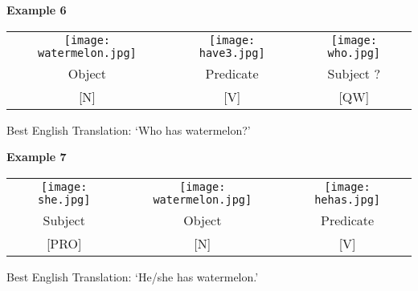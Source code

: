 \documentclass{tufte-book}
\begin{document}
\vspace{0.25cm}\noindent \textbf{Example 6}
\begin{table*}[h!]
\begin{tabular}{c | c |c}
\texttt{[image: watermelon.jpg]}&\texttt{[image: have3.jpg]}&\texttt{[image: who.jpg]}\\
\footnotesize Object & \footnotesize Predicate & \footnotesize Subject ?\\
\footnotesize [N] & \footnotesize [V] & \footnotesize [QW]\\
\end{tabular}
\end{table*}

Best English Translation: `Who has watermelon?'

\vspace{0.25cm}\noindent \textbf{Example 7}
\begin{table*}[h!]
\begin{tabular}{c | c |c}
\texttt{[image: she.jpg]}&\texttt{[image: watermelon.jpg]}&\texttt{[image: hehas.jpg]}\\
\footnotesize Subject& \footnotesize Object & \footnotesize Predicate\\
\footnotesize [PRO] & \footnotesize [N] & \footnotesize [V]\\
\end{tabular}
\end{table*}

Best English Translation: `He/she has watermelon.'
\end{document}
